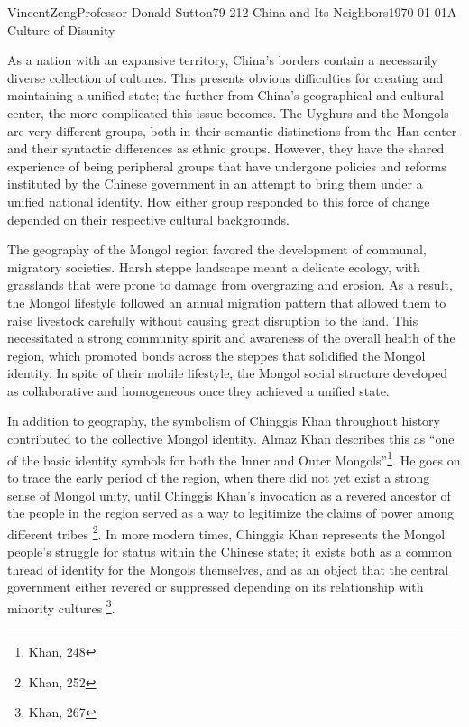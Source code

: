 \documentclass{article}[12pt]
\begin{document}
\begin{mla}{Vincent}{Zeng}{Professor Donald Sutton}{79-212 China and Its Neighbors}{\today}{A Culture of Disunity}

As a nation with an expansive territory, China's borders contain a necessarily
diverse collection of cultures. This presents obvious difficulties for
creating and maintaining a unified state; the further from China's
geographical and cultural center, the more complicated this issue becomes. The
Uyghurs and the Mongols are very different groups, both in their semantic
distinctions from the Han center and their syntactic differences as ethnic
groups.  However, they have the shared experience of being peripheral groups
that have undergone policies and reforms instituted by the Chinese government
in an attempt to bring them under a unified national identity. How either group
responded to this force of change depended on their respective cultural
backgrounds.

The geography of the Mongol region favored the development of communal,
migratory societies. Harsh steppe landscape meant a delicate ecology,
with grasslands that were prone to damage from overgrazing and erosion. As a
result, the Mongol lifestyle followed an annual migration pattern that allowed
them to raise livestock carefully without causing great disruption to the
land. This necessitated a strong community spirit and awareness of the
overall health of the region, which promoted bonds across the steppes that solidified the Mongol
identity. In spite of their mobile lifestyle, the Mongol social structure
developed as collaborative and homogeneous once they achieved a unified state.

In addition to geography, the symbolism of
Chinggis Khan throughout history contributed to the collective Mongol identity.
Almaz Khan describes this as ``one of the basic identity symbols for both the
Inner and Outer Mongols''\footnote{Khan,
248}. He goes on to trace the early period of the region, when there did
not yet exist a strong sense of Mongol unity, until Chinggis Khan's invocation as a
revered ancestor of the people in the region served as a way to legitimize the
claims of power among different tribes \footnote{Khan, 252}. In more modern
times, Chinggis Khan represents the Mongol people's struggle for status within
the Chinese state; it exists both as a common thread of identity for the
Mongols themselves, and as an object that the central government either revered
or suppressed depending on its relationship with minority cultures
\footnote{Khan, 267}.


\end{mla}
\end{document}
